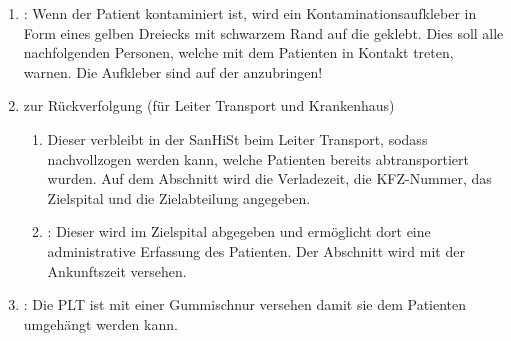 {\begin{enumerate}
  Triagestelle wieder entfernt. 
  Tote erhalten zusätzlich zur
   eine schwarze
  {}\,-Karte.
  \item {}: 
  Wenn der Patient kontaminiert ist, wird ein
  Kontaminationsaufkleber in Form eines gelben Dreiecks mit
  schwarzem Rand auf die  geklebt. 
  Dies soll alle
  nachfolgenden Personen, welche mit dem Patienten in Kontakt
  treten, warnen. 
  Die Aufkleber sind auf 
  der  anzubringen!
  \item {} zur Rückverfolgung (für Leiter Transport 
  und Krankenhaus)
  \begin{enumerate}
    \item {}
    Dieser verbleibt in der SanHiSt beim Leiter Transport, sodass nachvollzogen 
    werden 
    kann, welche Patienten bereits abtransportiert wurden. Auf dem Abschnitt 
    wird die Verladezeit, die KFZ-Nummer, das Zielspital und die Zielabteilung 
    angegeben.
    \item {}: 
    Dieser wird im Zielspital 
    abgegeben und ermöglicht dort eine administrative Erfassung des Patienten. 
    Der Abschnitt wird mit der Ankunftszeit versehen.
  \end{enumerate}
  \item {}: 
  Die PLT ist mit einer Gummischnur versehen 
  damit sie dem Patienten umgehängt werden kann.
\end{enumerate}



}
